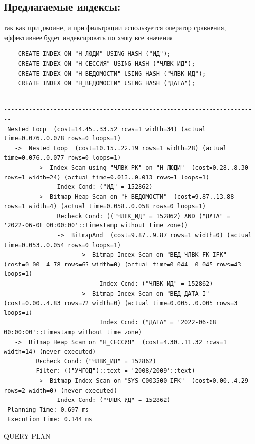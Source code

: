 \subsection{Предлагаемые индексы:}
так как при джоине, и при фильтрации используется оператор сравнения, эффективнее будет индексировать по хэшу все значения
\begin{verbatim}
    CREATE INDEX ON "Н_ЛЮДИ" USING HASH ("ИД");
    CREATE INDEX ON "Н_СЕССИЯ" USING HASH ("ЧЛВК_ИД");
    CREATE INDEX ON "Н_ВЕДОМОСТИ" USING HASH ("ЧЛВК_ИД");
    CREATE INDEX ON "Н_ВЕДОМОСТИ" USING HASH ("ДАТА");
\end{verbatim}
\tiny
\begin{verbatim}
----------------------------------------------------------------------------------------------------------------------------------------------
 Nested Loop  (cost=14.45..33.52 rows=1 width=34) (actual time=0.076..0.078 rows=0 loops=1)
   ->  Nested Loop  (cost=10.15..22.19 rows=1 width=28) (actual time=0.076..0.077 rows=0 loops=1)
         ->  Index Scan using "ЧЛВК_PK" on "Н_ЛЮДИ"  (cost=0.28..8.30 rows=1 width=24) (actual time=0.013..0.013 rows=1 loops=1)
               Index Cond: ("ИД" = 152862)
         ->  Bitmap Heap Scan on "Н_ВЕДОМОСТИ"  (cost=9.87..13.88 rows=1 width=4) (actual time=0.058..0.058 rows=0 loops=1)
               Recheck Cond: (("ЧЛВК_ИД" = 152862) AND ("ДАТА" = '2022-06-08 00:00:00'::timestamp without time zone))
               ->  BitmapAnd  (cost=9.87..9.87 rows=1 width=0) (actual time=0.053..0.054 rows=0 loops=1)
                     ->  Bitmap Index Scan on "ВЕД_ЧЛВК_FK_IFK"  (cost=0.00..4.78 rows=65 width=0) (actual time=0.044..0.045 rows=43 loops=1)
                           Index Cond: ("ЧЛВК_ИД" = 152862)
                     ->  Bitmap Index Scan on "ВЕД_ДАТА_I"  (cost=0.00..4.83 rows=72 width=0) (actual time=0.005..0.005 rows=3 loops=1)
                           Index Cond: ("ДАТА" = '2022-06-08 00:00:00'::timestamp without time zone)
   ->  Bitmap Heap Scan on "Н_СЕССИЯ"  (cost=4.30..11.32 rows=1 width=14) (never executed)
         Recheck Cond: ("ЧЛВК_ИД" = 152862)
         Filter: (("УЧГОД")::text = '2008/2009'::text)
         ->  Bitmap Index Scan on "SYS_C003500_IFK"  (cost=0.00..4.29 rows=2 width=0) (never executed)
               Index Cond: ("ЧЛВК_ИД" = 152862)
 Planning Time: 0.697 ms
 Execution Time: 0.144 ms
\end{verbatim}                                                                  QUERY PLAN
